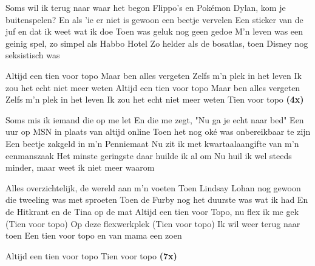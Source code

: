 
\begin{verse*}
Soms wil ik terug naar waar het begon
Flippo's en Pokémon
Dylan, kom je buitenspelen?
En als 'ie er niet is gewoon een beetje vervelen
Een sticker van de juf en dat ik weet wat ik doe
Toen was geluk nog geen gedoe
M'n leven was een geinig spel, zo simpel als Habbo Hotel
Zo helder als de bosatlas, toen Disney nog seksistisch was
\end{verse*}

\begin{chorus}
Altijd een tien voor topo
Maar ben alles vergeten
Zelfs m'n plek in het leven
Ik zou het echt niet meer weten
Altijd een tien voor topo
Maar ben alles vergeten
Zelfs m'n plek in het leven
Ik zou het echt niet meer weten
Tien voor topo \textbf{(4x)}
\end{chorus}

\begin{verse*}
Soms mis ik iemand die op me let 
En die me zegt, "Nu ga je echt naar bed"
Een uur op MSN in plaats van altijd online
Toen het nog oké was onbereikbaar te zijn 
Een beetje zakgeld in m'n Penniemaat
Nu zit ik met kwartaalaangifte van m'n eenmanszaak
Het minste geringste daar huilde ik al om
Nu huil ik wel steeds minder, maar weet ik niet meer waarom
\end{verse*}

\thechorus

\begin{verse*}
Alles overzichtelijk, de wereld aan m'n voeten
Toen Lindsay Lohan nog gewoon die tweeling was met sproeten
Toen de Furby nog het duurste was wat ik had
En de Hitkrant en de Tina op de mat 
Altijd een tien voor Topo, nu flex ik me gek
(Tien voor topo) Op deze flexwerkplek
(Tien voor topo) Ik wil weer terug naar toen
Een tien voor topo en van mama een zoen
\end{verse*}

\begin{verse*}
Altijd een tien voor topo
Tien voor topo \textbf{(7x)}
\end{verse*}